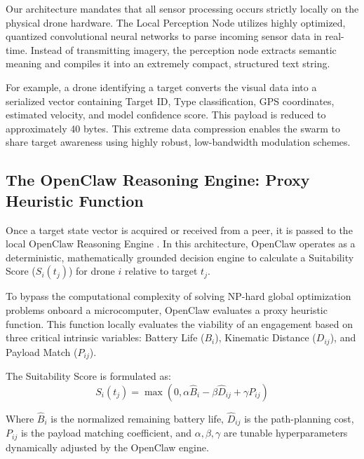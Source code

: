 \documentclass[10pt]{article}
\begin{document}
Our architecture mandates that all sensor processing occurs strictly locally on the physical drone hardware. The Local Perception Node utilizes highly optimized, quantized convolutional neural networks to parse incoming sensor data in real-time. Instead of transmitting imagery, the perception node extracts semantic meaning and compiles it into an extremely compact, structured text string.

For example, a drone identifying a target converts the visual data into a serialized vector containing Target ID, Type classification, GPS coordinates, estimated velocity, and model confidence score. This payload is reduced to approximately 40 bytes. This extreme data compression enables the swarm to share target awareness using highly robust, low-bandwidth modulation schemes.

\subsection{The OpenClaw Reasoning Engine: Proxy Heuristic Function}
Once a target state vector is acquired or received from a peer, it is passed to the local OpenClaw Reasoning Engine \cite{steinberger2026}. In this architecture, OpenClaw operates as a deterministic, mathematically grounded decision engine to calculate a Suitability Score ($S_i(t_j)$) for drone $i$ relative to target $t_j$. 

To bypass the computational complexity of solving NP-hard global optimization problems onboard a microcomputer, OpenClaw evaluates a proxy heuristic function. This function locally evaluates the viability of an engagement based on three critical intrinsic variables: Battery Life ($B_i$), Kinematic Distance ($D_{ij}$), and Payload Match ($P_{ij}$).

The Suitability Score is formulated as:
\begin{equation}
S_i(t_j) = \max \left(0, \alpha \hat{B}_i - \beta \hat{D}_{ij} + \gamma P_{ij} \right)
\label{eq:suitability}
\end{equation}

Where $\hat{B}_i$ is the normalized remaining battery life, $\hat{D}_{ij}$ is the path-planning cost, $P_{ij}$ is the payload matching coefficient, and $\alpha, \beta, \gamma$ are tunable hyperparameters dynamically adjusted by the OpenClaw engine.
\end{document}
